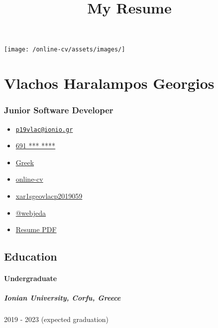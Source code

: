 \documentclass[english,]{article}
\title{My Resume}
\date{}
\providecommand{\tightlist}{%
  \setlength{\itemsep}{0pt}\setlength{\parskip}{0pt}}
\let\oldparagraph\paragraph
\renewcommand{\paragraph}[1]{\oldparagraph{#1}\mbox{}}
\let\oldsubparagraph\subparagraph
\renewcommand{\subparagraph}[1]{\oldsubparagraph{#1}\mbox{}}
\begin{document}
\maketitle

\texttt{[image: /online-cv/assets/images/]}

\hypertarget{vlachos-haralampos-georgios}{%
\section{Vlachos Haralampos
Georgios}\label{vlachos-haralampos-georgios}}

\hypertarget{junior-software-developer}{%
\subsubsection{Junior Software
Developer}\label{junior-software-developer}}

\begin{itemize}
\tightlist
\item
  \emph{} \href{mailto:p19vlac@ionio.gr}{\nolinkurl{p19vlac@ionio.gr}}
\item
  \emph{} \href{tel:691\%20***\%20****}{691 *** ****}
\item
  \emph{} \href{}{Greek}
\item
  \emph{} \href{http://online-cv}{online-cv}
\item
  \emph{}
  \href{http://github.com/xar1sgeovlacp2019059}{xar1sgeovlacp2019059}
\item
  \emph{} \href{https://twitter.com/@webjeda}{@webjeda}
\item
  \emph{} \href{http://www.africau.edu/images/default/sample.pdf}{Resume
  PDF}
\end{itemize}

\hypertarget{education}{%
\subsection{Education}\label{education}}

\hypertarget{undergraduate}{%
\paragraph{Undergraduate}\label{undergraduate}}

\hypertarget{ionian-university-corfu-greece}{%
\subparagraph{Ionian University, Corfu,
Greece}\label{ionian-university-corfu-greece}}

2019 - 2023 (expected graduation)
\end{document}
